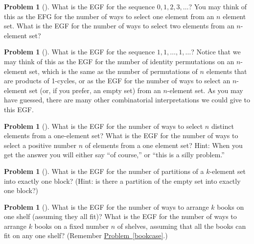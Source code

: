 \documentclass[10pt,]{book}
\theoremstyle{plain}
\theoremstyle{definition}
\newtheorem{activity}[project]{Problem}
\theoremstyle{definition}
\numberwithin{equation}{chapter}
\begin{document}
\begin{activity}[] \label{activity-379}
What is the EGF for the sequence \(0,1,2,3,\ldots\)? You may think of this as the EFG for the number of ways to select one element from an \(n\) element set. What is the EGF for the number of ways to select two elements from an \(n\)-element set?%
\end{activity}
\begin{activity}[] \label{allonessequence}
What is the EGF for the sequence \(1,1,\ldots,1,\ldots\)? Notice that we may think of this as the EGF for the number of identity permutations on an \(n\)-element set, which is the same as the number of permutations of \(n\) elements that are products of 1-cycles, or as the EGF for the number of ways to select an \(n\)-element set (or, if you prefer, an empty set) from an \(n\)-element set. As you may have guessed, there are many other combinatorial interpretations we could give to this EGF.%
\end{activity}
\begin{activity}[] \label{activity-381}
What is the EGF for the number of ways to select \(n\) distinct elements from a one-element set? What is the EGF for the number of ways to select a positive number \(n\) of elements from a one element set?  Hint: When you get the answer you will either say ``of course,'' or ``this is a silly problem.''%
\end{activity}
\begin{activity}[] \label{oneblockpartitions}
What is the EGF for the number of partitions of a \(k\)-element set into exactly one block? (Hint: is there a partition of the empty set into exactly one block?)%
\end{activity}
\begin{activity}[] \label{exponentialbookshelf}
What is the EGF for the number of ways to arrange \(k\) books on one shelf (assuming they all fit)? What is the EGF for the number of ways to arrange \(k\) books on a fixed number \(n\) of shelves, assuming that all the books can fit on any one shelf? (Remember \hyperref[bookcase]{Problem~\ref{bookcase}}.)%
\end{activity}
\typeout{************************************************}
\typeout{************************************************}
\end{document}

